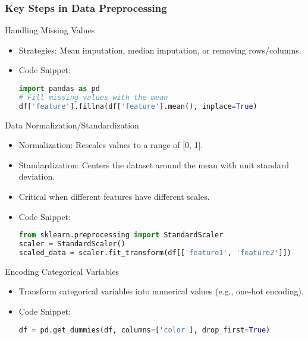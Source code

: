 \documentclass[aspectratio=169]{beamer}
\begin{document}
\begin{frame}[fragile]
    \frametitle{Key Steps in Data Preprocessing}
    
    \begin{block}{Handling Missing Values}
        \begin{itemize}
            \item Strategies: Mean imputation, median imputation, or removing rows/columns.
            \item Code Snippet:
            \begin{lstlisting}[language=Python]
import pandas as pd
# Fill missing values with the mean
df['feature'].fillna(df['feature'].mean(), inplace=True)
            \end{lstlisting}
        \end{itemize}
    \end{block}
    
    \begin{block}{Data Normalization/Standardization}
        \begin{itemize}
            \item Normalization: Rescales values to a range of [0, 1].
            \item Standardization: Centers the dataset around the mean with unit standard deviation.
            \item Critical when different features have different scales.
            \item Code Snippet:
            \begin{lstlisting}[language=Python]
from sklearn.preprocessing import StandardScaler
scaler = StandardScaler()
scaled_data = scaler.fit_transform(df[['feature1', 'feature2']])
            \end{lstlisting}
        \end{itemize}
    \end{block}
    
    \begin{block}{Encoding Categorical Variables}
        \begin{itemize}
            \item Transform categorical variables into numerical values (e.g., one-hot encoding).
            \item Code Snippet:
            \begin{lstlisting}[language=Python]
df = pd.get_dummies(df, columns=['color'], drop_first=True)
            \end{lstlisting}
        \end{itemize}
    \end{block}
\end{frame}
\end{document}
